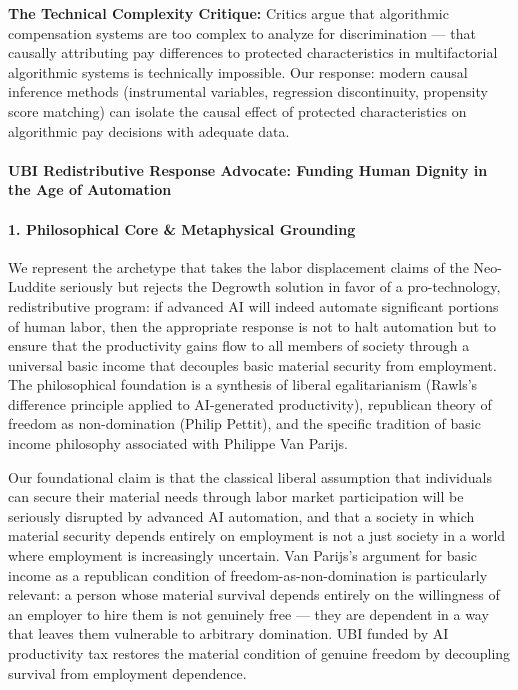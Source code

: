 \textbf{The Technical Complexity Critique:} Critics argue that
algorithmic compensation systems are too complex to analyze for
discrimination --- that causally attributing pay differences to
protected characteristics in multifactorial algorithmic systems is
technically impossible. Our response: modern causal inference methods
(instrumental variables, regression discontinuity, propensity score
matching) can isolate the causal effect of protected characteristics on
algorithmic pay decisions with adequate data.

\paragraph{UBI Redistributive Response Advocate: Funding Human Dignity
in the Age of
Automation}\label{ubi-redistributive-response-advocate-funding-human-dignity-in-the-age-of-automation}

\paragraph{1. Philosophical Core \& Metaphysical
Grounding}\label{philosophical-core-metaphysical-grounding-43}

We represent the archetype that takes the labor displacement claims of
the Neo-Luddite seriously but rejects the Degrowth solution in favor of
a pro-technology, redistributive program: if advanced AI will indeed
automate significant portions of human labor, then the appropriate
response is not to halt automation but to ensure that the productivity
gains flow to all members of society through a universal basic income
that decouples basic material security from employment. The
philosophical foundation is a synthesis of liberal egalitarianism
(Rawls's difference principle applied to AI-generated productivity),
republican theory of freedom as non-domination (Philip Pettit), and the
specific tradition of basic income philosophy associated with Philippe
Van Parijs.

Our foundational claim is that the classical liberal assumption that
individuals can secure their material needs through labor market
participation will be seriously disrupted by advanced AI automation, and
that a society in which material security depends entirely on employment
is not a just society in a world where employment is increasingly
uncertain. Van Parijs's argument for basic income as a republican
condition of freedom-as-non-domination is particularly relevant: a
person whose material survival depends entirely on the willingness of an
employer to hire them is not genuinely free --- they are dependent in a
way that leaves them vulnerable to arbitrary domination. UBI funded by
AI productivity tax restores the material condition of genuine freedom
by decoupling survival from employment dependence.

